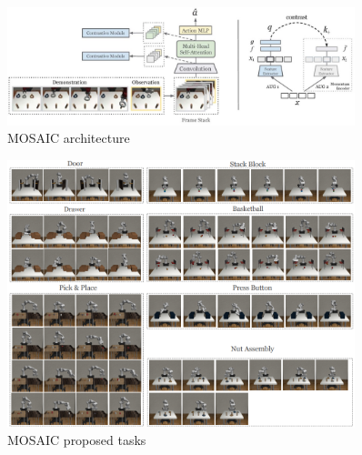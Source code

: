 \begin{figure}[htb]
    \centering
    \includegraphics[width=0.9\textwidth]{Figures/images/mosaic/mosaic.jpg}
    \caption{MOSAIC architecture \cite{mandi2022towards_more_generalizable_one_shot}}
    \label{fig:mosaic}
\end{figure}

\begin{figure}[htb]
    \centering
    \includegraphics[width=0.9\textwidth]{Figures/images/mosaic/mosaic_tasks.png}
    \caption{MOSAIC \cite{mandi2022towards_more_generalizable_one_shot} proposed tasks}
    \label{fig:mosaic_tasks}
\end{figure}
